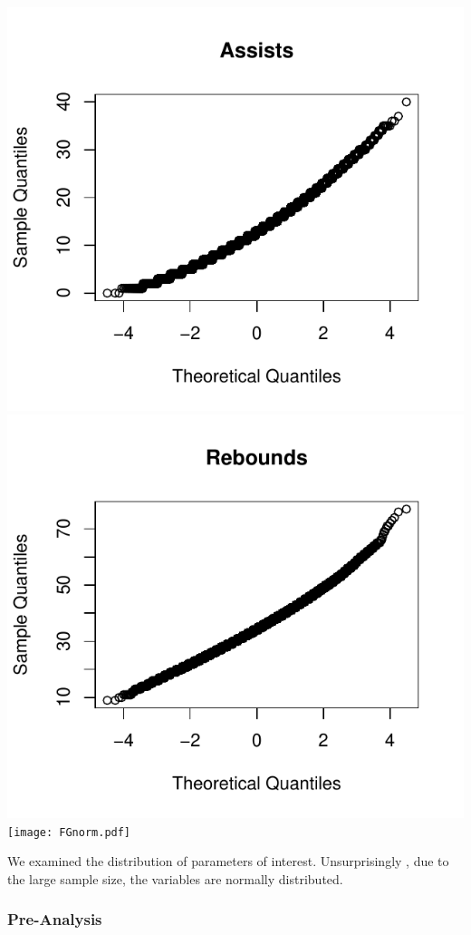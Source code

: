 \documentclass[11pt]{beamer}
\begin{document}
\begin{frame}
\begin{center}
	\includegraphics[scale=0.33]{assnorm.pdf}
	\includegraphics[scale=0.33]{rbnorm.pdf}
	\texttt{[image: FGnorm.pdf]} 
\end{center}
\footnotesize\center We examined the distribution of parameters of interest. Unsurprisingly , due to the large sample size, the variables are normally distributed.
\frametitle{{\textbf{\huge Pre-Analysis}}}
\end{frame}
\end{document}
